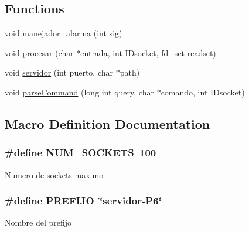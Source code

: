 \subsection*{Functions}
\begin{DoxyCompactItemize}
\item 
void \hyperlink{_g-2361-06-_p1-_server_8h_ad27ad83298aac3580deda730e80a62f0}{manejador\+\_\+alarma} (int sig)
\item 
void \hyperlink{_g-2361-06-_p1-_server_8h_a3053755c82b5168bea9d848b1284f3ca}{procesar} (char $\ast$entrada, int I\+Dsocket, fd\+\_\+set readset)
\item 
void \hyperlink{_g-2361-06-_p1-_server_8h_ae168ee6fdf31fd5ed7d49d45b89a65ed}{servidor} (int puerto, char $\ast$path)
\item 
void \hyperlink{_g-2361-06-_p1-_server_8h_ab7e145be74e8922987621cd01b8d446e}{parse\+Command} (long int query, char $\ast$comando, int I\+Dsocket)
\end{DoxyCompactItemize}


\subsection{Macro Definition Documentation}
\subsubsection[{\texorpdfstring{N\+U\+M\+\_\+\+S\+O\+C\+K\+E\+TS}{NUM_SOCKETS}}]{\setlength{\rightskip}{0pt plus 5cm}\#define N\+U\+M\+\_\+\+S\+O\+C\+K\+E\+TS~100}\hypertarget{_g-2361-06-_p1-_server_8h_a1c803e4ececfb47d2791c9283c85eb00}{}\label{_g-2361-06-_p1-_server_8h_a1c803e4ececfb47d2791c9283c85eb00}
Numero de sockets maximo 
\subsubsection[{\texorpdfstring{P\+R\+E\+F\+I\+JO}{PREFIJO}}]{\setlength{\rightskip}{0pt plus 5cm}\#define P\+R\+E\+F\+I\+JO~\char`\"{}servidor-\/P6\char`\"{}}\hypertarget{_g-2361-06-_p1-_server_8h_a78c658ff923693099f7b621e7c351129}{}\label{_g-2361-06-_p1-_server_8h_a78c658ff923693099f7b621e7c351129}
Nombre del prefijo 
